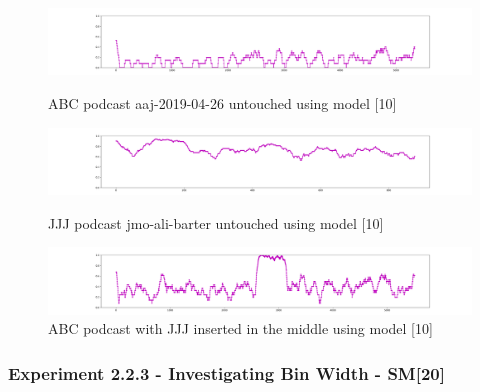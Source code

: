 \begin{figure}[h]
\begin{center}

\includegraphics[scale=0.2]{src/main-matter/results/experiment-age/entropy/audio_aug/[10]/aaj-2019-04-26}
\caption{ABC podcast aaj-2019-04-26 untouched using model [10]}

\includegraphics[scale=0.2]{src/main-matter/results/experiment-age/entropy/audio_aug/[10]/jmo-ali-barter}
\caption{JJJ podcast jmo-ali-barter untouched using model [10]}


\includegraphics[scale=0.2]{src/main-matter/results/experiment-age/entropy/audio_aug/[10]/abc-with-middle-jjj}
\caption{ABC podcast with JJJ inserted in the middle using model [10]}

%


\label{default}
\end{center}
\end{figure}


\subsubsection{Experiment 2.2.3 - Investigating Bin Width - SM[20]}

